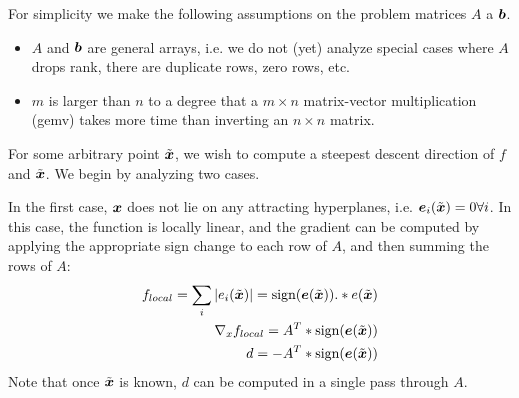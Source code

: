 \documentclass[12pt,journal,draftcls,letterpaper,twocolumn]{IEEEtran}
\begin{document}
For simplicity we make the following assumptions on the problem matrices $A$ a $\boldsymbol{b}$.
\begin{itemize}
\item $A$ and $\boldsymbol{b}$ are general arrays, i.e. we do not (yet) analyze special cases
where $A$ drops rank, there are duplicate rows, zero rows, etc.
\item $m$ is larger than $n$ to a degree that a $m \times n$ matrix-vector multiplication (gemv)
takes more time than inverting an $n\times n$ matrix.  
\end{itemize}

For some arbitrary point $\tilde{{\boldsymbol{x}}}$, we wish to compute a steepest descent
direction of $f$ and $\tilde{{\boldsymbol{x}}}$.  We begin by analyzing two cases.

In the first case, ${\boldsymbol{x}}$ does not lie on any attracting hyperplanes, i.e. $\boldsymbol{e}_i(\tilde{{\boldsymbol{x}}})=0
\forall i$. In this case, the function is locally linear, and the gradient can be computed
by applying the appropriate sign change to each row of $A$, and then summing the rows of $A$:
\begin{eqnarray}
f_{local} = \sum_i |e_i(\tilde{{\boldsymbol{x}}})| = {\text{sign}}(\boldsymbol{e}(\tilde{{\boldsymbol{x}}})) .* e(\tilde{{\boldsymbol{x}}}) \\
\nabla_x f_{local} = A^T * {\text{sign}}(\boldsymbol{e}(\tilde{{\boldsymbol{x}}})) \\
d = -A^T * {\text{sign}}(\boldsymbol{e}(\tilde{{\boldsymbol{x}}})) \\
\end{eqnarray}
Note that once $\tilde{{\boldsymbol{x}}}$ is known, $d$ can be computed in a single pass through $A$.
\end{document}
